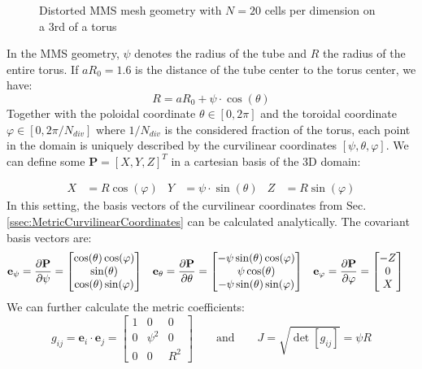 \begin{figure}[H]
\begin{subfigure}[b]{0.4\textwidth}
		\label{fig:MMSModelTorturedCrossSection}
	\end{subfigure}	
	\caption{Distorted MMS mesh geometry with $N=20$ cells per dimension on a 3rd of a torus}
	\label{fig:MMSModelScheme}
\end{figure}

In the MMS geometry, $\psi$ denotes the radius of the tube and $R$ the radius of the entire torus. If $aR_0=1.6$ is the distance of the tube center to the torus center, we have:
$$  R = aR_0 + \psi\cdot\cos(\theta) $$
Together with the poloidal coordinate $\theta\in[0,2\pi]$ and the toroidal coordinate $\varphi\in[0,2\pi/N_{div}]$ where $1/N_{div}$ is the considered fraction of the torus, each point in the domain is uniquely described by the curvilinear coordinates $[\psi,\theta,\varphi]$. 
We can define some $\mathbf{P} = [X,Y,Z]^T$ in a cartesian basis of the 3D domain:

\begin{align*}
	X &= R\cos(\varphi) &  Y &= \psi\cdot\sin(\theta)  &  Z &= R\sin(\varphi)
\end{align*} 
In this setting, the basis vectors of the curvilinear coordinates from Sec. \ref{ssec:MetricCurvilinearCoordinates} can be calculated analytically. The covariant basis vectors are:
\begin{align*}
	\mathbf{e}_\psi &= \pdv{\mathbf{P}}{\psi} = \begin{bmatrix} \cos(\theta)\cos(\varphi) \\ \sin(\theta) \\ \cos(\theta)\sin(\varphi) \end{bmatrix} & \mathbf{e}_\theta &= \pdv{\mathbf{P}}{\theta} = \begin{bmatrix} -\psi\sin(\theta)\cos(\varphi) \\ \psi\cos(\theta) \\ -\psi\sin(\theta)\sin(\varphi) \end{bmatrix} & \mathbf{e}_\varphi &= \pdv{\mathbf{P}}{\varphi} = \begin{bmatrix} -Z \\ 0 \\ X \end{bmatrix}
\end{align*}
We can further calculate the metric coefficients:
$$ g_{ij} = \mathbf{e}_i\cdot\mathbf{e}_j
= \begin{bmatrix}
	1 & 0 & 0 \\ 0 & \psi^2 & 0 \\ 0 & 0 & R^2
\end{bmatrix} \qquad \text{and} \qquad J = \sqrt{\det[g_{ij}]} = \psi R$$
 
